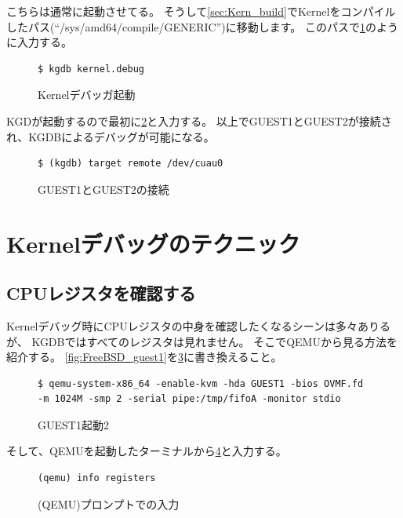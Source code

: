 \documentclass[a4j]{jarticle}
\begin{document}
\begin{multicols}{2}
こちらは通常に起動させてる。
そうして\ref{sec:Kern_build}でKernelをコンパイルしたパス(``/sys/amd64/compile/GENERIC'')に移動します。
このパスで\ref{fig:FreeBSD_gdb}のように入力する。
\begin{figure}[htbp]
	\begin{center}
		\begin{lstlisting}[basicstyle=\ttfamily\footnotesize, frame=single, breaklines=true]
$ kgdb kernel.debug
		\end{lstlisting}
	\end{center}
	\caption{Kernelデバッガ起動}
	\label{fig:FreeBSD_gdb}
\end{figure}

KGDが起動するので最初に\ref{fig:FreeBSD_gdb_cuau0}と入力する。
以上でGUEST1とGUEST2が接続され、KGDBによるデバッグが可能になる。
\begin{figure}[htbp]
	\begin{center}
		\begin{lstlisting}[basicstyle=\ttfamily\footnotesize, frame=single, breaklines=true]
$ (kgdb) target remote /dev/cuau0
		\end{lstlisting}
	\end{center}
	\caption{GUEST1とGUEST2の接続}
	\label{fig:FreeBSD_gdb_cuau0}
\end{figure}

\section{Kernelデバッグのテクニック}
\subsection{CPUレジスタを確認する}
Kernelデバッグ時にCPUレジスタの中身を確認したくなるシーンは多々ありるが、
KGDBではすべてのレジスタは見れません。
そこでQEMUから見る方法を紹介する。
\ref{fig:FreeBSD_guest1}を\ref{fig:FreeBSD_guest2}に書き換えること。
\begin{figure}[htbp]
	\begin{center}
		\begin{lstlisting}[basicstyle=\ttfamily\footnotesize, frame=single, breaklines=true]
$ qemu-system-x86_64 -enable-kvm -hda GUEST1 -bios OVMF.fd -m 1024M -smp 2 -serial pipe:/tmp/fifoA -monitor stdio
		\end{lstlisting}
	\end{center}
	\caption{GUEST1起動2}
	\label{fig:FreeBSD_guest2}
\end{figure}
そして、QEMUを起動したターミナルから\ref{fig:QEMU_reg_chk}と入力する。
\begin{figure}[htbp]
	\begin{center}
		\begin{lstlisting}[basicstyle=\ttfamily\footnotesize, frame=single, breaklines=true]
(qemu) info registers
		\end{lstlisting}
	\end{center}
	\caption{(QEMU)プロンプトでの入力}
	\label{fig:QEMU_reg_chk}
\end{figure}


\end{multicols}
\end{document}
